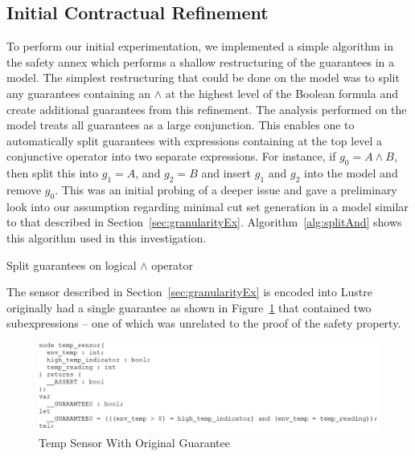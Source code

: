 \subsection{Initial Contractual Refinement}
\label{sec:granularityANDAlg}
To perform our initial experimentation, we implemented a simple algorithm in the safety annex which performs a shallow restructuring of the guarantees in a model. The simplest restructuring that could be done on the model was to split any guarantees containing an $\land$ at the highest level of the Boolean formula and create additional guarantees from this refinement. The analysis performed on the model treats all guarantees as a large conjunction. This enables one to automatically split guarantees with expressions containing at the top level a conjunctive operator into two separate expressions. For instance, if $g_0 = A \land B$, then split this into $g_1 = A$, and $g_2 = B$ and insert $g_1$ and $g_2$ into the model and remove $g_0$. This was an initial probing of a deeper issue and gave a preliminary look into our assumption regarding minimal cut set generation in a model similar to that described in Section~\ref{sec:granularityEx}. Algorithm~\ref{alg:splitAnd} shows this algorithm used in this investigation. 

\begin{algorithm}[h]

	\caption{Split guarantees on logical $\land$ operator}
	\label{alg:splitAnd}
\end{algorithm}

The sensor described in Section~\ref{sec:granularityEx} is encoded into Lustre originally had a single guarantee as shown in Figure~\ref{fig:lustreOneGuar} that contained two subexpressions -- one of which was unrelated to the proof of the safety property.

\begin{figure}[h!]
\begin{center}
\includegraphics[width=1.0\textwidth]{images/lustreTwoGuar.PNG}
\caption{Temp Sensor With Original Guarantee} \label{fig:lustreOneGuar}
\end{center}
\end{figure}
 
